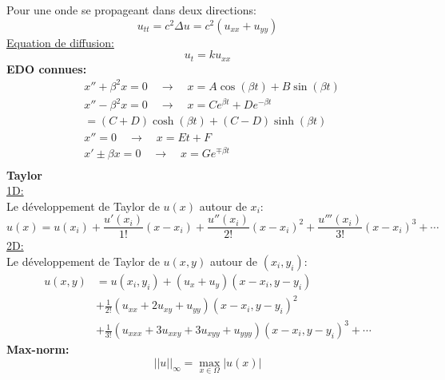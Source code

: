 Pour une onde se propageant dans deux directions:
\begin{equation*}
    u_{tt}=c^2\Delta u=c^2(u_{xx}+u_{yy})
\end{equation*}
\underline{Equation de diffusion:}
\begin{equation*}
    u_t=ku_{xx}
\end{equation*}
\textbf{EDO connues:}
\begin{equation*}
    \begin{aligned}
         & x''+\beta^2x=0 \quad\rightarrow\quad x=A\cos(\beta t)+B\sin(\beta t) \\
         & x''-\beta^2x=0 \quad\rightarrow\quad x=Ce^{\beta t}+De^{-\beta t}    \\
         & =(C+D)\cosh(\beta t)+(C-D)\sinh(\beta t)                             \\
         & x''=0 \quad\rightarrow\quad x=Et+F                                   \\
         & x'\pm \beta x=0 \quad\rightarrow\quad x=Ge^{\mp\beta t}              \\
    \end{aligned}
\end{equation*}
\textbf{Taylor}\\
\underline{1D:}\\
Le développement de Taylor de $u(x)$ autour de $x_i$:
\begin{equation*}
    u(x)=u(x_i)+\frac{u'(x_i)}{1!}(x-x_i)+\frac{u''(x_i)}{2!}(x-x_i)^2+\frac{u'''(x_i)}{3!}(x-x_i)^3+\cdots
\end{equation*}
\underline{2D:}\\
Le développement de Taylor de $u(x,y)$ autour de $(x_i,y_i)$:
\begin{equation*}
    \begin{aligned}
        u(x,y) & =u(x_i,y_i)+(u_x+u_y)(x-x_i,y-y_i)                                     \\
               & +\frac{1}{2!}(u_{xx}+2u_{xy}+u_{yy})(x-x_i,y-y_i)^2                    \\
               & +\frac{1}{3!}(u_{xxx}+3u_{xxy}+3u_{xyy}+u_{yyy})(x-x_i,y-y_i)^3+\cdots
    \end{aligned}
\end{equation*}
\textbf{Max-norm:}
\begin{equation*}
    ||u||_{\infty}=\max_{x\in\Omega}|u(x)|
\end{equation*}


\columnbreak
